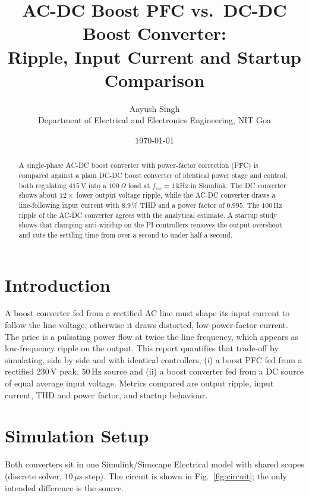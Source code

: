 \documentclass[11pt,a4paper]{article}
\title{AC-DC Boost PFC vs.\ DC-DC Boost Converter:\\
       Ripple, Input Current and Startup Comparison}
\author{Aayush Singh\\ Department of Electrical and Electronics Engineering, NIT Goa}
\date{\today}
\begin{document}
\maketitle

\begin{abstract}
A single-phase AC-DC boost converter with power-factor correction (PFC) is compared
against a plain DC-DC boost converter of identical power stage and control, both
regulating $415\,\mathrm{V}$ into a $100\,\Omega$ load at $f_{sw}=1\,\mathrm{kHz}$ in Simulink.
The DC converter shows about $12\times$ lower output voltage ripple, while the AC-DC
converter draws a line-following input current with $8.9\,\%$ THD and a power factor of
$0.995$. The $100\,\mathrm{Hz}$ ripple of the AC-DC converter agrees with the analytical
estimate. A startup study shows that clamping anti-windup on the PI controllers removes
the output overshoot and cuts the settling time from over a second to under half a second.
\end{abstract}

\section{Introduction}
A boost converter fed from a rectified AC line must shape its input current to follow
the line voltage, otherwise it draws distorted, low-power-factor current. The price is a
pulsating power flow at twice the line frequency, which appears as low-frequency ripple
on the output. This report quantifies that trade-off by simulating, side by side and with
identical controllers, (i) a boost PFC fed from a rectified $230\,\mathrm{V}$ peak,
$50\,\mathrm{Hz}$ source and (ii) a boost converter fed from a DC source of equal average
input voltage. Metrics compared are output ripple, input current, THD and power factor,
and startup behaviour.

\section{Simulation Setup}
Both converters sit in one Simulink/Simscape Electrical model with shared scopes
(discrete solver, $10\,\mu\mathrm{s}$ step). The circuit is shown in Fig.~\ref{fig:circuit};
the only intended difference is the source.
\end{document}
